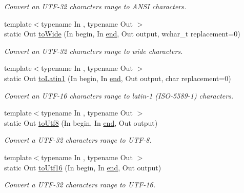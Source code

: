 \begin{DoxyCompactItemize}
\begin{DoxyCompactList}\small\item\em Convert an U\-T\-F-\/32 characters range to A\-N\-S\-I characters. \end{DoxyCompactList}\item 
{\footnotesize template$<$typename In , typename Out $>$ }\\static Out \hyperlink{classsf_1_1_utf_3_0132_01_4_a0d5bf45a9732beb935592da6bed1242c}{to\-Wide} (In begin, In \hyperlink{gl3_8h_a432111147038972f06e049e18a837002}{end}, Out output, wchar\-\_\-t replacement=0)
\begin{DoxyCompactList}\small\item\em Convert an U\-T\-F-\/32 characters range to wide characters. \end{DoxyCompactList}\item 
{\footnotesize template$<$typename In , typename Out $>$ }\\static Out \hyperlink{classsf_1_1_utf_3_0132_01_4_a064ce0ad81768d0d99b6b3e2e980e3ce}{to\-Latin1} (In begin, In \hyperlink{gl3_8h_a432111147038972f06e049e18a837002}{end}, Out output, char replacement=0)
\begin{DoxyCompactList}\small\item\em Convert an U\-T\-F-\/16 characters range to latin-\/1 (I\-S\-O-\/5589-\/1) characters. \end{DoxyCompactList}\item 
{\footnotesize template$<$typename In , typename Out $>$ }\\static Out \hyperlink{classsf_1_1_utf_3_0132_01_4_a193e155964b073c8ba838434f41d5e97}{to\-Utf8} (In begin, In \hyperlink{gl3_8h_a432111147038972f06e049e18a837002}{end}, Out output)
\begin{DoxyCompactList}\small\item\em Convert a U\-T\-F-\/32 characters range to U\-T\-F-\/8. \end{DoxyCompactList}\item 
{\footnotesize template$<$typename In , typename Out $>$ }\\static Out \hyperlink{classsf_1_1_utf_3_0132_01_4_a3f97efb599ad237af06f076f3fcfa354}{to\-Utf16} (In begin, In \hyperlink{gl3_8h_a432111147038972f06e049e18a837002}{end}, Out output)
\begin{DoxyCompactList}\small\item\em Convert a U\-T\-F-\/32 characters range to U\-T\-F-\/16. \end{DoxyCompactList}\item 

\end{DoxyCompactItemize}
